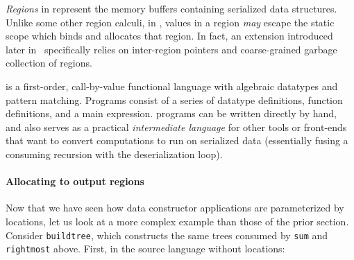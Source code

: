 \documentclass[showabstract,showacknowledgments,showpreface,showdedication]{iuphd}
\theoremstyle{nonumberplain}
\begin{document}
{\emph{Regions} in \ourcalc{} represent the memory buffers containing serialized data
  structures.  Unlike some other region calculi, in \ourcalc{}, values in a
  region \emph{may} escape the static scope which binds and allocates that region. In
  fact, an extension introduced later in~
  specifically relies on inter-region pointers and coarse-grained garbage
  collection of regions.}


\ourcalc{} is a first-order,
call-by-value functional language with algebraic datatypes and pattern
matching. Programs consist of a series of datatype definitions, function
definitions, and a main expression.
%
%
\ourcalc{} programs can be written directly by hand, and \ourcalc{} also serves
as a practical {\em intermediate language} for other tools or front-ends that
want to convert computations to run on serialized data (essentially fusing a
consuming recursion with the deserialization loop).
%

\paragraph{Allocating to output regions}
%
Now that we have seen how data constructor applications are parameterized by
locations, let us look at a more complex example than those of the prior section.
Consider \lstinline[mathescape]{buildtree}, which constructs the same trees consumed by \lstinline[mathescape]{sum}
and \lstinline[mathescape]{rightmost} above.  First, in the source language without locations:
\end{document}
